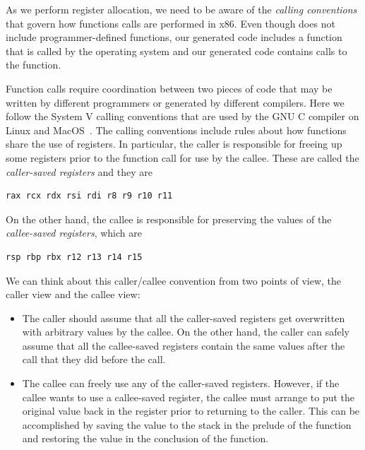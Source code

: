 \documentclass[7x10]{TimesAPriori_MIT}%
\begin{document}
As we perform register allocation, we need to be aware of the
\emph{calling conventions}  that govern how
functions calls are performed in x86.
%
Even though \LangVar{} does not include programmer-defined functions,
our generated code includes a  function that is called by
the operating system and our generated code contains calls to the
 function.

Function calls require coordination between two pieces of code that
may be written by different programmers or generated by different
compilers. Here we follow the System V calling conventions that are
used by the GNU C compiler on Linux and
MacOS~\citep{Bryant:2005aa,Matz:2013aa}.
%
The calling conventions include rules about how functions share the
use of registers. In particular, the caller is responsible for freeing
up some registers prior to the function call for use by the callee.
These are called the \emph{caller-saved registers}
and they are
\begin{lstlisting}
rax rcx rdx rsi rdi r8 r9 r10 r11
\end{lstlisting}
On the other hand, the callee is responsible for preserving the values
of the \emph{callee-saved registers}, 
which are
\begin{lstlisting}
rsp rbp rbx r12 r13 r14 r15
\end{lstlisting}

We can think about this caller/callee convention from two points of
view, the caller view and the callee view:
\begin{itemize}
\item The caller should assume that all the caller-saved registers get
  overwritten with arbitrary values by the callee.  On the other hand,
  the caller can safely assume that all the callee-saved registers
  contain the same values after the call that they did before the
  call.
\item The callee can freely use any of the caller-saved registers.
  However, if the callee wants to use a callee-saved register, the
  callee must arrange to put the original value back in the register
  prior to returning to the caller. This can be accomplished by saving
  the value to the stack in the prelude of the function and restoring
  the value in the conclusion of the function.
\end{itemize}
\end{document}
